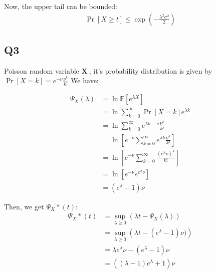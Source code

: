 \documentclass[a4paper, 12pt, titlepage]{article}
\begin{document}
Now, the upper tail can be bounded:
\begin{equation}
    \begin{aligned}
        \Pr \left[ X \geq t \right] \leq \exp \left( - \frac{\lambda^2 \sigma^2}{2} \right)
    \end{aligned}
\end{equation}

\subsection{Q3}
Poisson random variable $\mathbf{X ~}$, it's probability distribution is given by $\Pr \left[ X = k \right] = e^{-\nu} \frac{\nu^{k}}{k!}$
We have:

\begin{equation}
    \begin{aligned}
        \Psi_{X}(\lambda) &= \ln \mathbb E \left[ e^{\lambda X} \right] \\
                          &= \ln \sum_{k = 0}^{\infty} \Pr \left[ X = k \right] e^{\lambda k} \\
                          &= \ln \sum_{k = 0}^{\infty} e^{ \lambda k - \nu } \frac{ \nu^{k}}{ k! } \\
                          &= \ln \left[ e^{ - \nu } \sum_{k = 0}^{\infty} e^{ \lambda k } \frac{ \nu^{k} }{ k! } \right] \\
                          &= \ln \left[ e^{ - \nu } \sum_{k = 0}^{\infty} \frac{\left( e^{ \lambda } \nu \right)^{k}}{ k! } \right] \\
                          &= \ln \left[ e^{ - \nu } e^{e^{\lambda} \nu } \right] \\
                          &= \left( e^{ \lambda } - 1 \right) \nu 
    \end{aligned}
\end{equation}

Then, we get $\Psi_{X}{*}(t)$:
\begin{equation}
    \begin{aligned}
        \Psi_{X}{*}(t) &= \sup_{\lambda \geq 0} \left( \lambda t - \Psi_{X}(\lambda) \right) \\
                       &= \sup_{\lambda \geq 0} \left( \lambda t - (e^{\lambda} - 1) \nu ) \right) \\
                       &= \lambda e^{\lambda} \nu - (e^{\lambda} - 1) \nu \\
                       &= \left( (\lambda - 1) e^{\lambda} + 1 \right) \nu 
    \end{aligned}
\end{equation}
\end{document}
